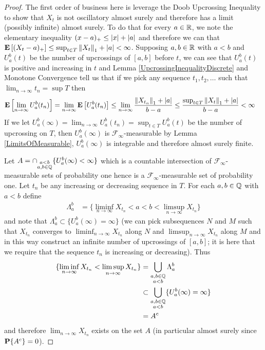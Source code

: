 \begin{proof}
The first order of business here is leverage the Doob Upcrossing
Inequality to show that $X_t$ is not oscillatory almost surely and therefore has a limit (possibly infinite) almost
surely.  To do that for every $a \in \mathbb{R}$, we note the elementary inequality $(x - a)_+ \leq
\left \vert x \right \vert + \left \vert a \right \vert$ and therefore we can that $\textbf{E}\left[(X_t -
  a)_+\right] \leq \sup_{t \in T} \left \lVert X_t \right \rVert_1 + \left \vert a \right \vert< \infty$.
Supposing $a,b \in \mathbb{R}$ with $a<b$ and $U_a^b(t)$ be the number of upcrossings of $[a,b]$ before $t$,
we can see that $U_a^b(t)$ is positive and increasing in $t$ and Lemma
\ref{UpcrossingInequalityDiscrete} and Monotone Convergence tell us
that if we pick any sequence $t_1, t_2, \dotsc$ such that $\lim_{n \to
  \infty} t_n = \sup T$ then
\begin{align*}
\textbf{E}\left[\lim_{n \to \infty} U_a^b(t_n)\right] &= \lim_{n \to \infty}
\textbf{E}\left[U_a^b(t_n)\right] \leq 
\lim_{n \to \infty} \frac{\left \lVert X_{t_n} \right \rVert_1 + \left \vert a \right \vert}{b-a} \leq 
\frac{\sup_{t \in T} \left \lVert X_t \right \rVert_1 + \left \vert a \right \vert}{b-a} < \infty
\end{align*}
If we let $U_a^b(\infty) = \lim_{n \to \infty} U_a^b(t_n) = \sup_{t
  \in T} U_a^b(t)$ be the number
of upcrossing on $T$, then $U_a^b(\infty)$ is
$\mathcal{F}_\infty$-measurable by Lemma \ref{LimitsOfMeasurable}, 
$U_a^b(\infty)$ is integrable and therefore almost
surely finite.

Let $A = \cap_{\substack{a < b\\ a,b \in \mathbb{Q}}} \lbrace
U_a^b(\infty) < \infty \rbrace$ which is a countable intersection of
$\mathcal{F}_\infty$-measurable sets of probability one hence is a
$\mathcal{F}_\infty$-measurable set of probability one.  Let $t_n$ be any
increasing or decreasing sequence in $T$.  For each $a,b \in \mathbb{Q}$ with $a<b$ define
\begin{align*}
\Lambda_a^b &=
\lbrace \liminf_{n \to \infty} X_{t_n} < a < b < \limsup_{n \to
  \infty} X_{t_n} \rbrace
\end{align*}
and note that $\Lambda_a^b \subset \lbrace U_a^b(\infty)
= \infty \rbrace$ (we can pick subsequences $N$ and $M$ such that
$X_{t_n}$ converges to $\liminf_{n \to \infty} X_{t_n}$ along $N$ and 
$\limsup_{n \to  \infty} X_{t_n}$ along $M$ and in this way construct an
infinite number of upcrossings of $[a,b]$; it is here that we require
that the sequence $t_n$ is increasing or decreasing).  Thus
\begin{align*}
\lbrace \liminf_{n \to \infty} X_{t_n} < \limsup_{n \to  \infty}
X_{t_n} \rbrace
&= \bigcup_{
\substack{
a,b \in \mathbb{Q} \\
a<b
}} \Lambda_a^b \\
&\subset \bigcup_{
\substack{
a,b \in \mathbb{Q} \\
a<b
}} \lbrace U_a^b(\infty) = \infty \rbrace  \\
&=A^c
\end{align*}
and therefore $\lim_{n \to \infty} X_{t_n}$ exists on the set $A$
(in particular almost surely since $\textbf{P}\{A^c\} = 0$).


\end{proof}
